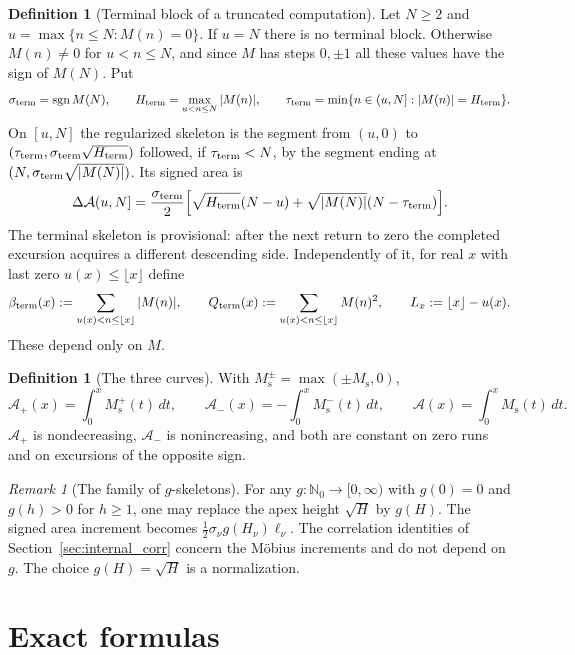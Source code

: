 \documentclass[11pt]{amsart}
\numberwithin{equation}{section}
\theoremstyle{plain}
\theoremstyle{definition}
\newtheorem{definition}[theorem]{Definition}
\theoremstyle{remark}
\newtheorem{remark}[theorem]{Remark}
\DeclareMathOperator{\sgn}{sgn}
\newcommand{\Ms}{M_{\mathrm{s}}}
\newcommand{\Ap}{\mathcal{A}_{+}}
\newcommand{\Am}{\mathcal{A}_{-}}
\newcommand{\Anet}{\mathcal{A}}
\begin{document}
\begin{definition}[Terminal block of a truncated computation]
\label{def:Ms-terminal}
Let $N\ge2$ and $u=\max\{n\le N:M(n)=0\}$. If $u=N$ there is no terminal
block. Otherwise $M(n)\ne0$ for $u<n\le N$, and since $M$ has steps
$0,\pm1$ all these values have the sign of $M(N)$. Put
\[
\sigma_{\rm term}=\sgn M(N),\qquad
H_{\rm term}=\max_{u<n\le N}|M(n)|,\qquad
\tau_{\rm term}=\min\{n\in(u,N]:|M(n)|=H_{\rm term}\}.
\]
On $[u,N]$ the regularized skeleton is the segment from $(u,0)$ to
$(\tau_{\rm term},\sigma_{\rm term}\sqrt{H_{\rm term}})$ followed, if
$\tau_{\rm term}<N$, by the segment ending at
$(N,\sigma_{\rm term}\sqrt{|M(N)|})$. Its signed area is
\[
\Delta\Anet(u,N]=\frac{\sigma_{\rm term}}2
\Bigl[\sqrt{H_{\rm term}}(N-u)+
\sqrt{|M(N)|}(N-\tau_{\rm term})\Bigr].
\]
The terminal skeleton is provisional: after the next return to zero the
completed excursion acquires a different descending side. Independently of
it, for real $x$ with last zero $u(x)\le\lfloor x\rfloor$ define
\[
\beta_{\rm term}(x):=\sum_{u(x)<n\le\lfloor x\rfloor}|M(n)|,\qquad
Q_{\rm term}(x):=\sum_{u(x)<n\le\lfloor x\rfloor}M(n)^2,\qquad
L_x:=\lfloor x\rfloor-u(x).
\]
These depend only on $M$.
\end{definition}

\begin{definition}[The three curves]
\label{def:areas}
With $\Ms^{\pm}=\max(\pm\Ms,0)$,
\begin{equation}
\label{eq:areas_def}
\Ap(x)=\int_0^x\Ms^+(t)\,dt,\qquad
\Am(x)=-\int_0^x\Ms^-(t)\,dt,\qquad
\Anet(x)=\int_0^x\Ms(t)\,dt.
\end{equation}
$\Ap$ is nondecreasing, $\Am$ is nonincreasing, and both are constant on
zero runs and on excursions of the opposite sign.
\end{definition}

\begin{remark}[The family of $g$-skeletons]
\label{rem:g-skeleton}
For any $g:\mathbb N_0\to[0,\infty)$ with $g(0)=0$ and $g(h)>0$ for $h\ge1$,
one may replace the apex height $\sqrt H$ by $g(H)$. The signed area
increment becomes $\tfrac12\sigma_\nu g(H_\nu)\ell_\nu$. The correlation
identities of Section~\ref{sec:internal_corr} concern the M\"obius
increments and do not depend on $g$. The choice $g(H)=\sqrt H$ is a
normalization.
\end{remark}

\section{Exact formulas}
\label{sec:formulas}
\end{document}
